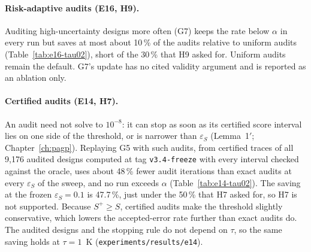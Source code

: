 

\paragraph{Risk-adaptive audits (E16, H9).} Auditing high-uncertainty designs more often (G7)
keeps the rate below $\alpha$ in every run but saves at most about 10\,\% of the audits relative
to uniform audits (Table~\ref{tab:e16-tau02}), short of the 30\,\% that H9 asked for. Uniform
audits remain the default. G7's update has no cited validity argument and is reported as an
ablation only.



\paragraph{Certified audits (E14, H7).} An audit need not solve to $10^{-8}$: it can stop
as soon as its certified score interval lies on one side of the threshold, or is narrower than
$\varepsilon_S$ (Lemma~1$'$; Chapter~\ref{ch:pagp}). Replaying G5 with such audits, from
certified traces of all 9{,}176 audited designs %
computed at tag \texttt{v3.4-freeze} with every interval checked against the oracle, uses about
48\,\% fewer audit iterations than exact audits at every $\varepsilon_S$ of the sweep, and no run
exceeds $\alpha$ (Table~\ref{tab:e14-tau02}). The saving at the frozen $\varepsilon_S = 0.1$ is
47.7\,\%, %
just under the 50\,\% that H7 asked for, so H7 is not supported. Because $S^+\ge S$, certified
audits make the threshold slightly conservative, which lowers the accepted-error rate further
than exact audits do. The audited designs and the stopping rule do not depend on $\tau$, so the
same saving holds at $\tau = 1$~K (\texttt{experiments/results/e14}).



